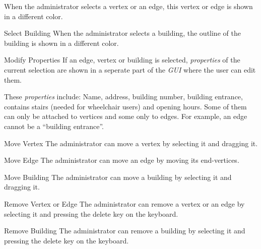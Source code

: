 \begin{numerate}[FMA]
	When the administrator selects a vertex or an edge, this vertex or edge is shown in a different color.
		\item[Select Building]
	When the administrator selects a building, the outline of the building is shown in a different color.
	\item[Modify Properties] If an edge, vertex or building is selected, \textit{properties} of the current selection are shown in a seperate part of the \textit{GUI} where the user can edit them.
		\begin{addmargin}[7mm]{0mm}
			These \textit{properties} include: Name, address, building number, building entrance, contains stairs (needed for wheelchair users) and opening hours.
			Some of them can only be attached to vertices and some only to edges. For example, an edge cannot be a ``building entrance''.
		\end{addmargin}
	\addtocounter{enumi}{-9} %
	\item[Move Vertex] The administrator can move a vertex by selecting it and dragging it.
	\item[Move Edge] The administrator can move an edge by moving its end-vertices.
	\item[Move Building] The administrator can move a building by selecting it and dragging it.
	\item[Remove Vertex or Edge] The administrator can remove a vertex or an edge by selecting it and pressing the delete key on the keyboard.
	\item[Remove Building] The administrator can remove a building by selecting it and pressing the delete key on the keyboard.
\end{numerate}
